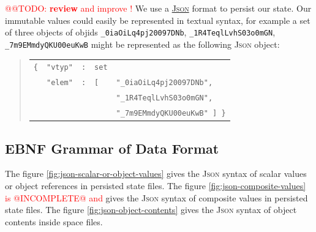 \documentclass[11pt,a4paper,svgnames]{article}
\begin{document}
       
{\textcolor{red}{@@TODO: \textbf{review} and improve !}} We use a \href{http://json.org}{\textsc{Json}} format
to persist our state. Our immutable values could easily be represented in
textual syntax, for example a set of three objects of objids
\texttt{\_0iaOiLq4pj20097DNb}, \texttt{\_1R4TeqlLvhS03o0mGN},
\texttt{\_7m9EMmdyQKU00euKwB} might be represented as the following
\textsc{Json} object:
\begin{quote}
\begin{relsize}{-1}
  \begin{tabular}{lllll}
    \texttt{\{} & \texttt{"vtyp"} & \texttt{:} & \texttt{set} & ~  \\
    ~           & \texttt{"elem"} & \texttt{:} & \texttt{[} & \texttt{"\_0iaOiLq4pj20097DNb",}  \\
    ~           & ~             & ~          & ~           & \texttt{"\_1R4TeqlLvhS03o0mGN",} \\
    ~           & ~             & ~          & ~           & \texttt{"\_7m9EMmdyQKU00euKwB" ] \}} \\
  \end{tabular}
\end{relsize}
\end{quote}

\medskip


\subsection{EBNF Grammar of Data Format}
\label{subsec:data-format-ebnf}


The figure \ref{fig:json-scalar-or-object-values} gives the
\textsc{Json} syntax of scalar values or object references in
persisted state files.  The figure \ref{fig:json-composite-values}
\textcolor{red}{is @INCOMPLETE@ and} gives the \textsc{Json} syntax
of composite values in persisted state files.  The figure
\ref{fig:json-object-contents} gives the \textsc{Json} syntax of
object contents inside space files.
\end{document}
